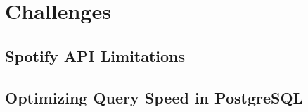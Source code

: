 \chapter{Challenges}
\label{ch:Challenges}

\section{Spotify API Limitations}

\section{Optimizing Query Speed in PostgreSQL}
